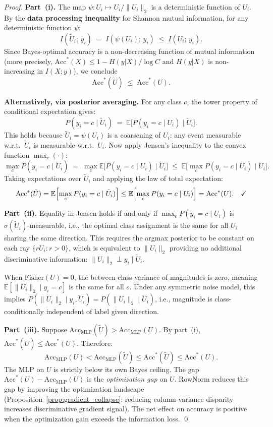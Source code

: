 \documentclass[11pt]{article}
\begin{document}
\begin{proof}
\textbf{Part~(i).}
The map $\psi: U_i \mapsto U_i/\|U_i\|_2$ is a deterministic function of $U_i$.
By the \textbf{data processing inequality} for Shannon mutual information,
for any deterministic function $\psi$:
\[
  I(\tilde{U}_i;\, y_i) \;=\; I(\psi(U_i);\, y_i) \;\leq\; I(U_i;\, y_i).
\]
Since Bayes-optimal accuracy is a non-decreasing function of mutual information
(more precisely, $\mathrm{Acc}^*(X) \leq 1 - H(y|X)/\log C$ and
$H(y|X)$ is non-increasing in $I(X;y)$), we conclude
\[
  \mathrm{Acc}^*(\tilde{U}) \;\leq\; \mathrm{Acc}^*(U).
\]

\textbf{Alternatively, via posterior averaging.}
For any class $c$, the tower property of conditional expectation gives:
\[
  P(y_i = c \mid \tilde{U}_i)
  \;=\; \mathbb{E}\bigl[P(y_i = c \mid U_i) \;\big|\; \tilde{U}_i\bigr].
\]
This holds because $\tilde{U}_i = \psi(U_i)$ is a coarsening of $U_i$:
any event measurable w.r.t.\ $\tilde{U}_i$ is measurable w.r.t.\ $U_i$.
Now apply Jensen's inequality to the convex function $\max_c(\cdot)$:
\[
  \max_c P(y_i = c \mid \tilde{U}_i)
  \;=\; \max_c \mathbb{E}\bigl[P(y_i=c\mid U_i)\;\big|\;\tilde{U}_i\bigr]
  \;\leq\; \mathbb{E}\bigl[\max_c P(y_i=c\mid U_i)\;\big|\;\tilde{U}_i\bigr].
\]
Taking expectations over $\tilde{U}_i$ and applying the law of total expectation:
\[
  \mathrm{Acc}^*(\tilde{U})
  = \mathbb{E}\Bigl[\max_c P(y_i=c\mid\tilde{U}_i)\Bigr]
  \leq \mathbb{E}\Bigl[\max_c P(y_i=c\mid U_i)\Bigr]
  = \mathrm{Acc}^*(U). \quad \checkmark
\]

\textbf{Part~(ii).}
Equality in Jensen holds if and only if $\max_c P(y_i=c\mid U_i)$ is
$\sigma(\tilde{U}_i)$-measurable, i.e., the optimal class assignment is the
same for all $U_i$ sharing the same direction.
This requires the argmax posterior to be constant on each ray
$\{rU_i : r > 0\}$, which is equivalent to $\|U_i\|_2$ providing no
additional discriminative information:
$\|U_i\|_2 \perp y_i \mid \tilde{U}_i$.

When $\mathrm{Fisher}(U) = 0$, the between-class variance of magnitudes is zero,
meaning $\mathbb{E}[\|U_i\|_2 \mid y_i = c]$ is the same for all $c$.
Under any symmetric noise model, this implies
$P(\|U_i\|_2 \mid y_i, \tilde{U}_i) = P(\|U_i\|_2 \mid \tilde{U}_i)$,
i.e., magnitude is class-conditionally independent of label given direction.

\textbf{Part~(iii).}
Suppose $\mathrm{Acc}_{\mathrm{MLP}}(\tilde{U}) > \mathrm{Acc}_{\mathrm{MLP}}(U)$.
By part~(i), $\mathrm{Acc}^*(\tilde{U}) \leq \mathrm{Acc}^*(U)$.
Therefore:
\[
  \mathrm{Acc}_{\mathrm{MLP}}(U)
  < \mathrm{Acc}_{\mathrm{MLP}}(\tilde{U})
  \leq \mathrm{Acc}^*(\tilde{U})
  \leq \mathrm{Acc}^*(U).
\]
The MLP on $U$ is strictly below its own Bayes ceiling.
The gap $\mathrm{Acc}^*(U) - \mathrm{Acc}_{\mathrm{MLP}}(U)$ is the
\emph{optimization gap} on $U$.
RowNorm reduces this gap by improving the optimization landscape
(Proposition~\ref{prop:gradient_collapse}: reducing column-variance
disparity increases discriminative gradient signal).
The net effect on accuracy is positive when the optimization gain
exceeds the information loss. \qed
\end{proof}
\end{document}

